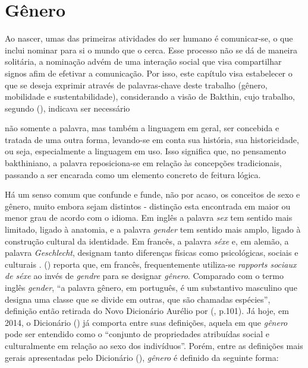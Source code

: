 \section{Gênero}

Ao nascer, umas das primeiras atividades do ser humano é comunicar-se, o que inclui nominar para si o mundo que o cerca. Esse processo não se dá de maneira solitária, a nominação advém de uma interação social que visa compartilhar signos afim de efetivar a comunicação. Por isso, este capítulo visa estabelecer o que se deseja exprimir através de palavras-chave deste trabalho (gênero, mobilidade e sustentabilidade), considerando a visão de Bakthin, cujo trabalho, segundo  (\citeyear{STELLA2005}), indicava ser necessário

\begin{citacao}
não somente a palavra, mas também a linguagem em geral, ser concebida e tratada de uma outra forma, levando-se em conta sua história, sua historicidade, ou seja, especialmente a linguagem em uso. Isso significa que, no pensamento bakthiniano, a palavra reposiciona-se em relação às concepções tradicionais, passando a ser encarada como um elemento concreto de feitura lógica.
\end{citacao}

Há um senso comum que confunde e funde, não por acaso, os conceitos de sexo e gênero, muito embora sejam distintos - distinção esta encontrada em maior ou menor grau de acordo com o idioma. Em inglês a palavra \emph{sex} tem sentido mais limitado, ligado à anatomia, e a palavra \emph{gender} tem sentido mais amplo, ligado à construção cultural da identidade. Em francês, a palavra \emph{séxe} e, em alemão, a palavra \emph{Geschlecht}, designam tanto diferenças físicas como psicológicas, sociais e culturais \cite{FRAISSE2001}.  (\citeyear{MORAES1998}) reporta que, em francês, frequentemente utiliza-se \emph{rapports sociaux de séxe} ao invés de \emph{gendre} para se designar \emph{gênero}. Comparado com o termo inglês \emph{gender}, ``a palavra gênero, em português, é um substantivo masculino que designa uma classe que se divide em outras, que são chamadas espécies'', definição então retirada do Novo Dicionário Aurélio por  (\citeyear{MORAES1998}, p.101).
Já hoje, em 2014, o Dicionário  (\citeyear{AURELIOONLINE})
já comporta entre suas definições, aquela em que \emph{gênero} pode ser entendido como o ``conjunto de propriedades atribuídas social e culturalmente em relação ao sexo dos indivíduos''.
Porém, entre as definições mais gerais apresentadas pelo Dicionário  (\citeyear{MICHAELISONLINE}), \emph{gênero} é definido da seguinte forma:

